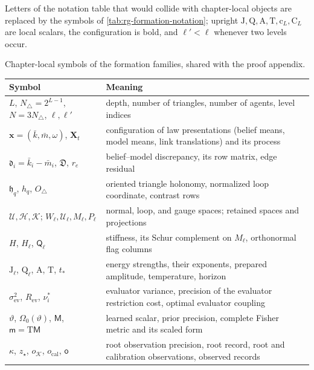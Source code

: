 Letters of the notation table that would collide with chapter-local objects
are replaced by the symbols of \cref{tab:rg-formation-notation}; upright
\(\mathrm J,\mathrm Q,\mathrm A,\mathrm T,\mathrm c_L,\mathrm C_L\) are local
scalars, the configuration is bold, and \(\ell'<\ell\) whenever two levels
occur.

\begin{sciencetable}{Chapter-local symbols of the formation families, shared with the proof appendix.}
\label{tab:rg-formation-notation}
\begin{tabularx}{\textwidth}{>{\raggedright\arraybackslash}p{}>{\raggedright\arraybackslash}X}
\toprule
\textbf{Symbol} & \textbf{Meaning} \\
\midrule
\(L\), \(N_\triangle=2^{L-1}\), \(N=3N_\triangle\), \(\ell,\ell'\) & depth, number of triangles, number of agents, level indices \\
\(\mathbf x=(\bar k,\bar m,\omega)\), \(\mathbf X_t\) & configuration of law presentations (belief means, model means, link translations) and its process \\
\(\mathfrak d_i=\bar k_i-\bar m_i\), \(\mathfrak D\), \(r_e\) & belief--model discrepancy, its row matrix, edge residual \\
\(\mathfrak h_q\), \(h_q\), \(O_\triangle\) & oriented triangle holonomy, normalized loop coordinate, contrast rows \\
\(\mathcal U,\mathcal H,\mathcal K\); \(W_\ell,\mathcal U_\ell,M_\ell,P_\ell\) & normal, loop, and gauge spaces; retained spaces and projections \\
\(H\), \(H_\ell\), \(\mathsf Q_\ell\) & stiffness, its Schur complement on \(M_\ell\), orthonormal flag columns \\
\(\mathrm J_\ell\), \(\mathrm Q_\ell\), \(\mathrm A\), \(\mathrm T\), \(t_*\) & energy strengths, their exponents, prepared amplitude, temperature, horizon \\
\(\sigma^2_{\mathrm{ev}}\), \(R_{\mathrm{ev}}\), \(\nu^*_i\) & evaluator variance, precision of the evaluator restriction cost, optimal evaluator coupling \\
\(\vartheta\), \(\Omega_0(\vartheta)\), \(\mathsf M\), \(\mathsf m=\mathrm T\mathsf M\) & learned scalar, prior precision, complete Fisher metric and its scaled form \\
\(\kappa\), \(z_\star\), \(o_{\mathcal K}\), \(o_{\mathrm{cal}}\), \(\mathsf o\) & root observation precision, root record, root and calibration observations, observed records \\

\end{tabularx}
\end{sciencetable}
